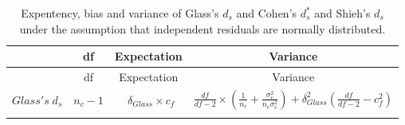 \documentclass[
  english,
  man,floatsintext]{apa6}
\begin{document}
\newpage
\begin{landscape}

\begin{longtable}[]{@{}lccc@{}}
\caption{Expentency, bias and variance of Glass's \(d_s\) and Cohen's \(d^*_s\) and Shieh's \(d_s\) under the assumption that independent residuals are normally distributed.}\tabularnewline
\toprule
\begin{minipage}[b]{0.10\columnwidth}\raggedright
\strut
\end{minipage} & \begin{minipage}[b]{0.18\columnwidth}\centering
df\strut
\end{minipage} & \begin{minipage}[b]{0.16\columnwidth}\centering
Expectation\strut
\end{minipage} & \begin{minipage}[b]{0.45\columnwidth}\centering
Variance\strut
\end{minipage}\tabularnewline
\midrule
\endfirsthead
\toprule
\begin{minipage}[b]{0.10\columnwidth}\raggedright
\strut
\end{minipage} & \begin{minipage}[b]{0.18\columnwidth}\centering
df\strut
\end{minipage} & \begin{minipage}[b]{0.16\columnwidth}\centering
Expectation\strut
\end{minipage} & \begin{minipage}[b]{0.45\columnwidth}\centering
Variance\strut
\end{minipage}\tabularnewline
\midrule
\endhead
\begin{minipage}[t]{0.10\columnwidth}\raggedright
\(Glass's \; d_s\)\strut
\end{minipage} & \begin{minipage}[t]{0.18\columnwidth}\centering
\(n_c-1\)\strut
\end{minipage} & \begin{minipage}[t]{0.16\columnwidth}\centering
~\(\delta_{Glass} \times c_f\)\strut
\end{minipage} & \begin{minipage}[t]{0.45\columnwidth}\centering
\(\frac{df}{df-2} \times \left( \frac{1}{n_c} + \frac{\sigma^2_e}{n_e\sigma^2_c}\right) + \delta^2_{Glass} \left( \frac{df}{df-2} - c_f^2 \right)\)\strut
\end{minipage}\tabularnewline
\begin{minipage}[t]{0.10\columnwidth}\raggedright

\end{minipage}
\end{longtable}
\end{landscape}
\end{document}
